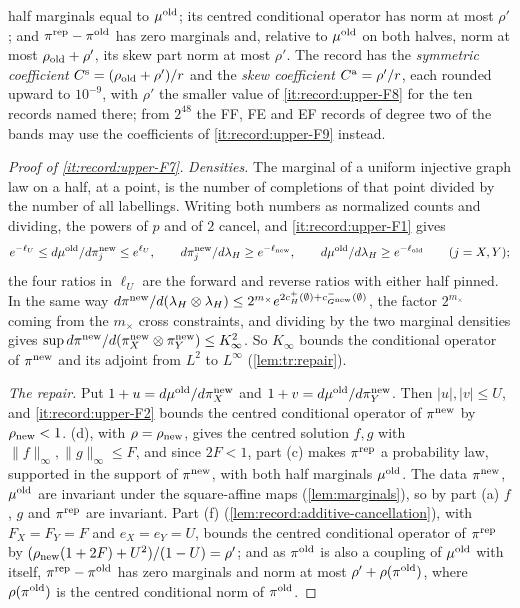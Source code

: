 \begin{enumerate}[label=\textup{(F\arabic*)},start=7]
 half marginals equal to $\mu^{\rm old}$; its centred conditional operator
 has norm at most $\rho'$; and $\pi^{\rm rep}-\pi^{\rm old}$ has zero
 marginals and, relative to $\mu^{\rm old}$ on both halves, norm at most
 $\rho_{\rm old}+\rho'$, its skew part norm at most $\rho'$. The record has the
 \emph{symmetric coefficient} $C^{\rm s}=(\rho_{\rm old}+\rho')/r$ and the
 \emph{skew coefficient} $C^{\rm a}=\rho'/r$, each rounded upward to $10^{-9}$,
 with $\rho'$ the smaller value of \ref{it:record:upper-F8} for the ten records
 named there; from $2^{48}$ the FF, FE and EF records of degree two of the bands
 may use the coefficients of \ref{it:record:upper-F9} instead.
\end{enumerate}

\begin{proof}[Proof of \ref{it:record:upper-F7}]
\emph{Densities.} The marginal of a uniform injective graph law on a half,
at a point, is the number of completions of that point divided by the
number of all labellings. Writing both numbers as normalized counts and
dividing, the powers of $p$ and of $2$ cancel, and \ref{it:record:upper-F1}
gives
\[
 e^{-\ell_U}\le\frac{d\mu^{\rm old}}{d\pi^{\rm new}_j}\le e^{\ell_U},\qquad
 \frac{d\pi^{\rm new}_j}{d\lambda_H}\ge e^{-\ell_{\rm new}},\qquad
 \frac{d\mu^{\rm old}}{d\lambda_H}\ge e^{-\ell_{\rm old}}
 \qquad(j=X,Y);
\]
the four ratios in $\ell_U$ are the forward and reverse ratios with either
half pinned. In the same way
$d\pi^{\rm new}/d(\lambda_H\otimes\lambda_H)\le2^{m_\times}e^{2c^+_H(\emptyset)
+c^-_{G^{\rm new}}(\emptyset)}$, the factor $2^{m_\times}$ coming from the
$m_\times$ cross constraints, and dividing by the two marginal densities gives
$\sup d\pi^{\rm new}/d(\pi^{\rm new}_X\otimes\pi^{\rm new}_Y)\le K_\infty^2$.
So $K_\infty$ bounds the conditional operator of $\pi^{\rm new}$ and its
adjoint from $L^2$ to $L^\infty$ (\cref{lem:tr:repair}).

\emph{The repair.} Put $1+u=d\mu^{\rm old}/d\pi^{\rm new}_X$ and
$1+v=d\mu^{\rm old}/d\pi^{\rm new}_Y$. Then $|u|,|v|\le U$, and
\ref{it:record:upper-F2} bounds the centred conditional operator of
$\pi^{\rm new}$ by $\rho_{\rm new}<1$. (d), with
$\rho=\rho_{\rm new}$, gives the centred solution $f,g$ with
$\|f\|_\infty,\|g\|_\infty\le F$, and since $2F<1$, part (c) makes
$\pi^{\rm rep}$ a probability law, supported in the support of
$\pi^{\rm new}$, with both half marginals $\mu^{\rm old}$. The data
$\pi^{\rm new}$, $\mu^{\rm old}$ are invariant under the square-affine maps
(\cref{lem:marginals}), so by part (a) $f$, $g$ and $\pi^{\rm rep}$ are
invariant. Part (f) (\cref{lem:record:additive-cancellation}), with
$F_X=F_Y=F$ and $e_X=e_Y=U$, bounds the centred conditional operator of
$\pi^{\rm rep}$ by $(\rho_{\rm new}(1+2F)+U^2)/(1-U)=\rho'$; and as
$\pi^{\rm old}$ is also a coupling of $\mu^{\rm old}$ with itself,
$\pi^{\rm rep}-\pi^{\rm old}$ has zero marginals and norm at most
$\rho'+\rho(\pi^{\rm old})$, where $\rho(\pi^{\rm old})$ is the centred
conditional norm of $\pi^{\rm old}$.


\end{proof}
